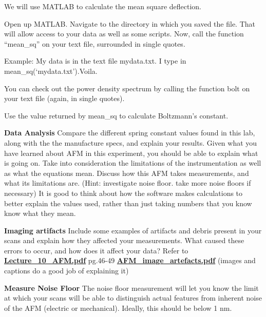 \documentclass{../lab}
\begin{document}
We will use MATLAB to calculate the mean square deflection.

Open up MATLAB. Navigate to the directory in which you saved the file. That will allow access to your data as well as some scripts. Now, call the function ``mean\_sq'' on your text file, surrounded in single quotes.

Example: My data is in the text file mydata.txt. I type in mean\_sq(‘mydata.txt’).Voila.

You can check out the power density spectrum by calling the function bolt on your text file (again, in single quotes).

Use the value returned by mean\_sq to calculate Boltzmann’s constant.

\textbf{Data Analysis}
Compare the different spring constant values found in this lab, along with the the manufacture specs, and explain your results.  Given what you have learned about AFM in this experiment, you should be able to explain what is going on.
Take into consideration the limitations of the instrumentation as well as what the equations mean.  Discuss how this AFM takes measurements, and what its limitations are.   (Hint: investigate noise floor. take more noise floors if necessary)
It is good to think about how the software makes calculations to better explain the values used, rather than just taking numbers that you know know what they mean.


\textbf{Imaging artifacts}
Include some examples of  artifacts and debris present in your scans and explain how they affected your measurements.  What caused these errors to occur, and how does it affect your data?
Refer to \href{http://experimentationlab.berkeley.edu/sites/default/files/AFMImages/Lecture\_10\_AFM.pdf}{\textbf{Lecture\_10\_AFM.pdf}}  pg.46-49
         \href{http://experimentationlab.berkeley.edu/sites/default/files/AFMImages/AFM\_image\_artefacts.pdf}{\textbf{AFM\_image\_artefacts.pdf}} (images and captions do a good job of explaining it)




\textbf{Measure Noise Floor}
The noise floor measurement will let you know the limit at which your scans will be able to distinguish actual features from inherent noise of the AFM (electric or mechanical).  Ideally, this should be below 1 nm.
\end{document}
